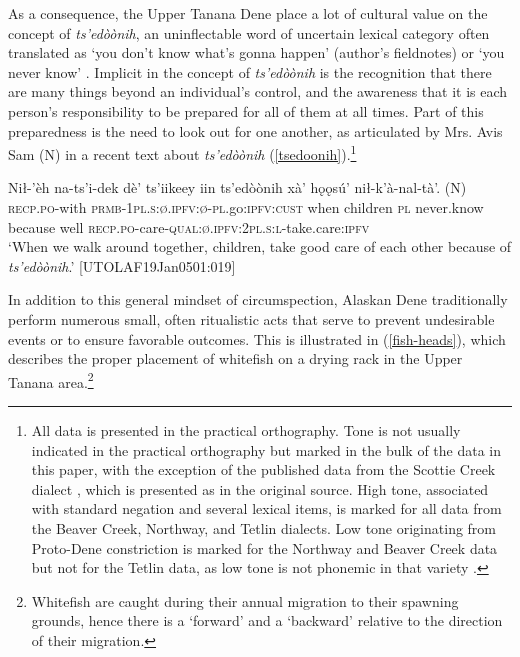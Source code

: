 \documentclass[output=paper,colorlinks,citecolor=brown
]{langscibook}
\begin{document}
As a consequence, the Upper Tanana Dene place a lot of cultural value on the concept of \textit{ts'edòònih}, an uninflectable word of uncertain lexical category often translated as `you don't know what's gonna happen' (author's fieldnotes) or `you never know' \citep{KariJ1997stem}.  Implicit in the concept of \textit{ts'edòònih} is the recognition that there are many things beyond an individual's control, and the awareness that it is each person's responsibility to be prepared for all of them at all times. Part of this preparedness is the need to look out for one another, as articulated by Mrs. Avis Sam (N) in a recent text about \textit{ts'edòònih} (\ref{tsedoonih}).\footnote{All data is presented in the practical orthography. Tone is not usually indicated in the practical orthography but marked in the bulk of the data in this paper, with the exception of the published data from the Scottie Creek dialect \citep{TyoneM1996}, which is presented as in the original source. High tone, associated with standard negation and several lexical items, is marked for all data from the Beaver Creek, Northway, and Tetlin dialects. Low tone originating from Proto-Dene constriction \citep{KraussM2005} is marked for the Northway and Beaver Creek data but not for the Tetlin data, as low tone is not phonemic in that variety \citep{MinouraN1994, LovickO2020}.}

\ea 
\label{tsedoonih}
\gll Nił-'èh na-ts'i-dek dè' ts'iikeey iin ts'edòònih xà' hǫǫsú' {nił-k'à-nal-tà'. \textnormal{(N)}} \\
\textsc{recp.po}-with \textsc{prmb-1pl.s:ø.ipfv:ø-pl}.go:\textsc{ipfv:cust} when children \textsc{pl} never.know because well \textsc{recp.po}-care-\textsc{qual:ø.ipfv:2pl.s:l}-take.care:\textsc{ipfv} \\
\glt `When we walk around together, children, take good care of each other because of \textit{ts'edòònih}.' \hfill [UTOLAF19Jan0501:019]\\
\z

In addition to this general mindset of circumspection, Alaskan Dene traditionally perform numerous small, often ritualistic acts that serve to prevent undesirable events or to ensure favorable outcomes. This is illustrated in (\ref{fish-heads}), which describes the proper placement of whitefish on a drying rack in the Upper Tanana area.\footnote{Whitefish are caught during their annual migration to their spawning grounds, hence there is a `forward' and a `backward' relative to the direction of their migration.} 
\end{document}
